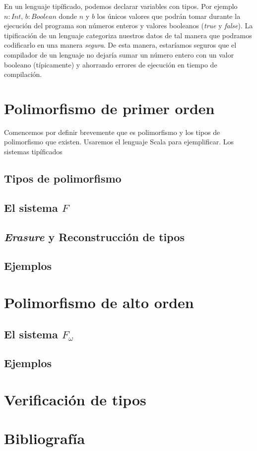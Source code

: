\documentclass[spanish,11pt]{article}
\begin{document}
En un lenguaje tipíficado, podemos declarar variables con tipos. Por ejemplo $n:Int$, $b:Boolean$ donde $n$ y $b$ los únicos valores que podrán tomar durante la ejecución del programa son números enteros y valores booleanos (\textit{true} y \textit{false}). La tipificación de un lenguaje categoriza nuestros datos de tal manera que podramos codificarlo en una manera \textit{segura}. De esta manera, estaríamos seguros que el compilador de un lenguaje no dejaría sumar un número entero con un valor booleano (típicamente) y ahorrando errores de ejecución en tiempo de compilación.

\section{Polimorfismo de primer orden}

Comencemos por definir brevemente que es polimorfismo y los tipos de polimorfismo que existen. Usaremos el lenguaje Scala para ejemplificar. Los sistemas tipíficados 


\subsection{Tipos de polimorfismo}

\subsection{El sistema $F$}

\subsection{\textit{Erasure} y Reconstrucción de tipos}

\subsection{Ejemplos}

\section{Polimorfismo de alto orden}

\subsection{El sistema $F_\omega$}

\subsection{Ejemplos}

\section{Verificación de tipos}

\section{Bibliografía}



\end{document}

